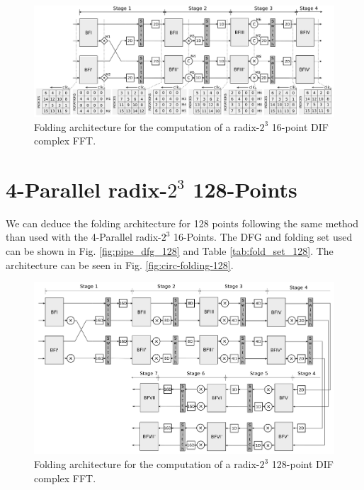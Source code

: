 \documentclass[journal,comsoc]{IEEEtran}
\begin{document}
\begin{figure} 
	\centering
	\includegraphics[width=\linewidth]{Diagramas/folding-16.png}
	\caption{Folding architecture for the computation of a radix-$2^3$ 16-point DIF complex FFT.}
	\label{fig:folding_16_arch}
\end{figure}



\section{4-Parallel radix-$2^3$ 128-Points}\label{sec:imp128}
We can deduce the folding architecture for 128 points following the same method than used with the 4-Parallel radix-$2^3$ 16-Points. The DFG and folding set used can be shown in Fig. \ref{fig:pipe_dfg_128} and Table \ref{tab:fold_set_128}.
The architecture can be seen in Fig. \ref{fig:circ-folding-128}.

\begin{small}

\end{small}

\begin{figure} 
	\centering
	\includegraphics[width=0.8\linewidth]{Diagramas/folding-128.png}
	\caption{Folding architecture for the computation of a radix-$2^3$ 128-point DIF complex FFT.}
	\label{fig:folding_128}
\end{figure}
\end{document}
